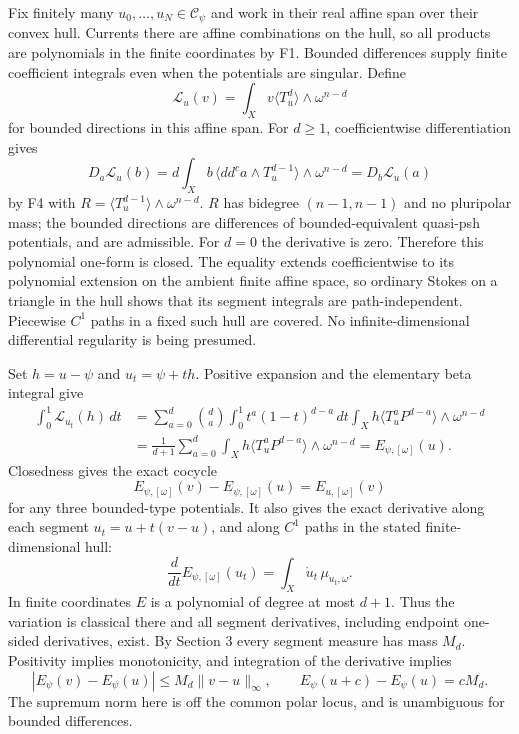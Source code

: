 \documentclass[
  10pt,
]{article}
\begin{document}
Fix finitely many \(u_0,\ldots,u_N\in\mathcal C_\psi\) and work in their
real affine span over their convex hull. Currents there are affine
combinations on the hull, so all products are polynomials in the finite
coordinates by F1. Bounded differences supply finite coefficient
integrals even when the potentials are singular. Define \[
\mathcal L_u(v)=\int_X v\langle T_u^d\rangle\wedge\omega^{n-d}
\] for bounded directions in this affine span. For \(d\geq1\),
coefficientwise differentiation gives \[
D_a\mathcal L_u(b)=d\int_X b\,\langle dd^ca\wedge T_u^{d-1}\rangle\wedge\omega^{n-d}
=D_b\mathcal L_u(a)
\] by F4 with \(R=\langle T_u^{d-1}\rangle\wedge\omega^{n-d}\). \(R\)
has bidegree \((n-1,n-1)\) and no pluripolar mass; the bounded
directions are differences of bounded-equivalent quasi-psh potentials,
and are admissible. For \(d=0\) the derivative is zero. Therefore this
polynomial one-form is closed. The equality extends coefficientwise to
its polynomial extension on the ambient finite affine space, so ordinary
Stokes on a triangle in the hull shows that its segment integrals are
path-independent. Piecewise \(C^1\) paths in a fixed such hull are
covered. No infinite-dimensional differential regularity is being
presumed.

Set \(h=u-\psi\) and \(u_t=\psi+th\). Positive expansion and the
elementary beta integral give \[
\begin{aligned}
\int_0^1\mathcal L_{u_t}(h)\,dt
&=\sum_{a=0}^d\binom da\int_0^1t^a(1-t)^{d-a}\,dt
\int_Xh\langle T_u^aP^{d-a}\rangle\wedge\omega^{n-d}\\
&=\frac1{d+1}\sum_{a=0}^d\int_Xh\langle T_u^aP^{d-a}\rangle\wedge\omega^{n-d}=E_{\psi,[\omega]}(u).
\end{aligned}
\] Closedness gives the exact cocycle \[
E_{\psi,[\omega]}(v)-E_{\psi,[\omega]}(u)=E_{u,[\omega]}(v)
\] for any three bounded-type potentials. It also gives the exact
derivative along each segment \(u_t=u+t(v-u)\), and along \(C^1\) paths
in the stated finite-dimensional hull: \[
\frac d{dt}E_{\psi,[\omega]}(u_t)=\int_X\dot u_t\,\mu_{u_t,\omega}.
\] In finite coordinates \(E\) is a polynomial of degree at most
\(d+1\). Thus the variation is classical there and all segment
derivatives, including endpoint one-sided derivatives, exist. By Section
3 every segment measure has mass \(M_d\). Positivity implies
monotonicity, and integration of the derivative implies \[
|E_\psi(v)-E_\psi(u)|\leq M_d\|v-u\|_\infty,
\qquad E_\psi(u+c)-E_\psi(u)=cM_d.
\] The supremum norm here is off the common polar locus, and is
unambiguous for bounded differences.
\end{document}
